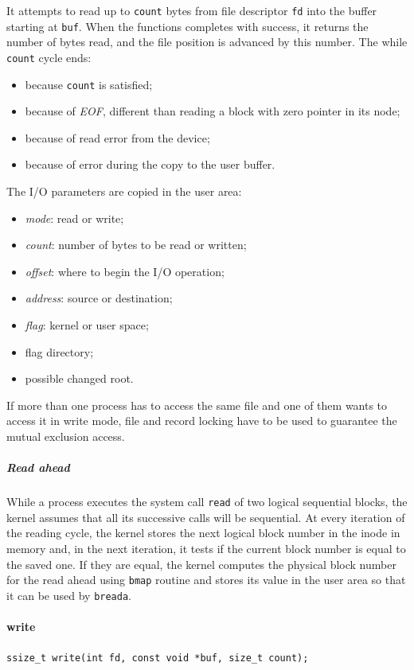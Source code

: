 It attempts to read up to \texttt{count} bytes from file descriptor \texttt{fd} into the buffer starting at \texttt{buf}. When the functions completes with success, it returns the number of bytes read, and the file position is advanced by this number. The while \texttt{count} cycle ends:
\begin{itemize}
\item because \texttt{count} is satisfied;
\item because of \emph{EOF}, different than reading a block with zero pointer in its node;
\item because of read error from the device;
\item because of error during the copy to the user buffer.
\end{itemize}
The I/O parameters are copied in the user area:
\begin{itemize}
\item \emph{mode}: read or write;
\item \emph{count}: number of bytes to be read or written;
\item \emph{offset}: where to begin the I/O operation;
\item \emph{address}: source or destination;
\item \emph{flag}: kernel or user space;
\item flag directory;
\item possible changed root.
\end{itemize}
If more than one process has to access the same file and one of them wants to access it in write mode, file and record locking have to be used to guarantee the mutual exclusion access.

\subparagraph{Read ahead}
While a process executes the system call \texttt{read} of two logical sequential blocks, the kernel assumes that all its successive calls will be sequential. At every iteration of the reading cycle, the kernel stores the next logical block number in the inode in memory and, in the next iteration, it tests if the current block number is equal to the saved one. If they are equal, the kernel computes the physical block number for the read ahead using \texttt{bmap} routine and stores its value in the user area so that it can be used by \texttt{breada}.

\paragraph{write}
\texttt{ssize\_t write(int fd, const void *buf, size\_t count);}

